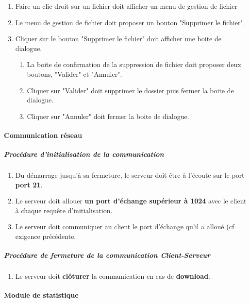 \documentclass[10pt,a4paper]{report}
\begin{document}
\begin{enumerate}
		\item Faire un clic droit sur un fichier doit afficher un menu de gestion de fichier
		\item Le menu de gestion de fichier doit proposer un bouton "Supprimer le fichier".
		\item Cliquer sur le bouton "Supprimer le fichier" doit afficher une boite de dialogue.
		\begin{enumerate}[label=\arabic*.]
			\item La boite de confirmation de la suppression de fichier doit proposer deux boutons, "Valider" et "Annuler".
			\item Cliquer sur "Valider" doit supprimer le dossier puis fermer la boite de dialogue.
			\item Cliquer sur "Annuler" doit fermer la boite de dialogue.
		\end{enumerate}
	\end{enumerate}	
\paragraph{Communication réseau}

	\subparagraph{Procédure d'initialisation de la communication}

		\begin{enumerate}
			\item  Du démarrage jusqu'à sa fermeture, le serveur doit être à l'écoute sur le port \textbf{port 21}.

			\item Le serveur doit allouer \textbf{un port d'échange supérieur à 1024} avec le client à chaque requête d'initialisation.

			\item Le serveur doit communiquer au client le port d'échange qu'il a alloué (cf exigence précédente.

		\end{enumerate}
		
\subparagraph{Procédure de fermeture de la communication Client-Serveur}

	\begin{enumerate}
		\item Le serveur doit \textbf{clôturer} la communication en cas de \textbf{download}. 
	\end{enumerate}
	
\paragraph{Module de statistique \\ \\}
\end{document}
